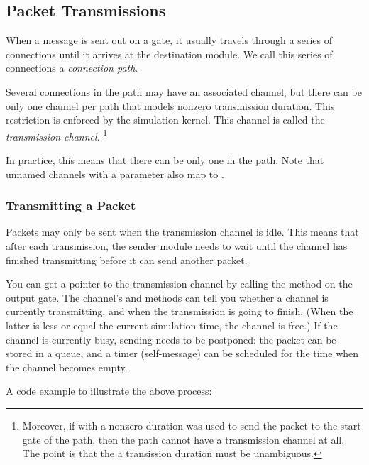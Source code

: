 \subsection{Packet Transmissions}
\label{sec:simple-modules:packet-transmission}

When a message is sent out on a gate, it usually travels through
a series of connections until it arrives at the destination module.
We call this series of connections a \textit{connection path}.

Several connections in the path may have an associated channel,
but there can be only one channel per path that models nonzero
transmission duration. This restriction is enforced by the simulation
kernel. This channel is called the \textit{transmission channel}.
  \footnote{Moreover, if  with a nonzero duration
  was used to send the packet to the start gate of the path,
  then the path cannot have a transmission channel at all.
  The point is that the a transission duration must be unambiguous.}

\begin{note}
  In practice, this means that there can be only one 
  in the path. Note that unnamed channels with a  parameter
  also map to .
\end{note}

\subsubsection{Transmitting a Packet}

Packets may only be sent when the transmission channel is idle.
This means that after each transmission, the sender module needs
to wait until the channel has finished transmitting before it can
send another packet.

You can get a pointer to the transmission channel by calling the
 method on the output gate.
The channel's  and 
methods can tell you whether a channel is currently transmitting,
and when the transmission is going to finish. (When the latter is
less or equal the current simulation time, the channel is free.)
If the channel is currently busy, sending needs to be postponed:
the packet can be stored in a queue, and a timer (self-message) can be
scheduled for the time when the channel becomes empty.

A code example to illustrate the above process:

